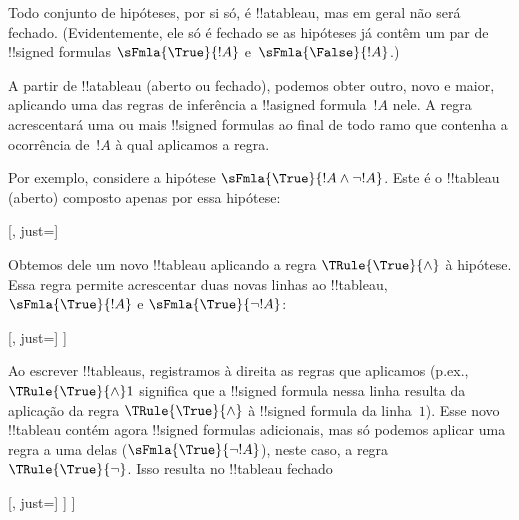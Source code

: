 \documentclass[../../../include/open-logic-section]{subfiles}
\begin{document}
\begin{ex}
  Todo conjunto de hipóteses, por si só, é !!a{tableau}, mas em geral
  não será fechado. (Evidentemente, ele só é fechado se as hipóteses
  já contêm um par de !!{signed formula}s
  $\sFmla{\True}{!A}$ e~$\sFmla{\False}{!A}$.)

  A partir de !!a{tableau} (aberto ou fechado), podemos obter outro,
  novo e maior, aplicando uma das regras de inferência a
  !!a{signed formula}~$!A$ nele. A regra acrescentará uma ou mais
  !!{signed formula}s ao final de todo ramo que contenha a ocorrência
  de~$!A$ à qual aplicamos a regra.

  Por exemplo, considere a hipótese $\sFmla{\True}{!A \land \lnot
    !A}$. Este é o !!{tableau} (aberto) composto apenas por essa
  hipótese:
  \begin{center}
    \begin{tableau}{}
      [, just=\TAss]
    \end{tableau}{}
  \end{center}
  Obtemos dele um novo !!{tableau} aplicando a regra $\TRule{\True}{\land}$
  à hipótese. Essa regra permite acrescentar duas novas linhas ao
  !!{tableau}, $\sFmla{\True}{!A}$ e $\sFmla{\True}{\lnot !A}$:
  \begin{center}
    \begin{tableau}{}
      [, just=\TAss
        [\sFmla{\True}{\formula{A}}, just={\TRule{\True}{\land}[1]},
          [\sFmla{\True}{\lnot \formula{A}}, just={\TRule{\True}{\land}[1]}
          ]
        ]
      ]
    \end{tableau}{}
  \end{center}
  Ao escrever !!{tableau}s, registramos à direita as regras que
  aplicamos (p.ex., $\TRule{\True}{\land} 1$ significa que a
  !!{signed formula} nessa linha resulta da aplicação da regra
  $\TRule{\True}{\land}$ à !!{signed formula} da linha~$1$).
  Esse novo !!{tableau} contém agora !!{signed formula}s adicionais,
  mas só podemos aplicar uma regra a uma delas
  ($\sFmla{\True}{\lnot !A}$), neste caso, a regra
  $\TRule{\True}{\lnot}$. Isso resulta no !!{tableau} fechado
  \begin{center}
    \begin{tableau}{}
      [, just=\TAss
        [\sFmla{\True}{\formula{A}}, just={\TRule{\True}{\land}[1]}
          [\sFmla{\True}{\lnot \formula{A}}, just={\TRule{\True}{\land}[1]}
            [\sFmla{\False}{\formula{A}}, just={\TRule{\True}{\lnot}[3]}, close]
          ]
        ]
      ]
    \end{tableau}{}
  \end{center}
\end{ex}
\end{document}
